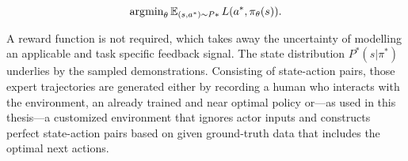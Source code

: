 \begin{equation}
\operatorname{\arg\!\min}_\theta \operatorname{\mathbb{E}}_{(s,a^*) \sim P*} L(a^*, \pi_\theta(s)).
\end{equation}

A reward function is not required, which takes away the uncertainty of modelling an applicable and task specific feedback signal. The state distribution $P^*(s|\pi^*)$ underlies by the sampled demonstrations. Consisting of state-action pairs, those expert trajectories are generated either by recording a human who interacts with the environment, an already trained and near optimal policy or—as used in this thesis—a customized environment that ignores actor inputs and constructs perfect state-action pairs based on given ground-truth data that includes the optimal next actions.